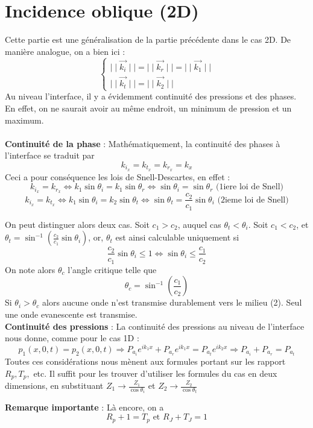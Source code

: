 \section{Incidence oblique (2D)}
Cette partie est une généralisation de la partie précédente dans le cas 2D. De manière analogue, on a bien ici :
\[
\left\{
\begin{array}{l}
\mid\mid \vec{k_i} \mid\mid = \mid\mid \vec{k_r} \mid\mid = \mid\mid \vec{k_1} \mid\mid \\
\mid\mid \vec{k_t} \mid\mid = \mid\mid \vec{k_2} \mid\mid
\end{array}
\right.
\]
Au niveau l'interface, il y a évidemment continuité des pressions et des phases. En effet, on ne saurait avoir au même endroit, un minimum de pression et un maximum.\\\\
\textbf{Continuité de la phase} : Mathématiquement, la continuité des phases à l'interface se traduit par
\[k_{i_x}=k_{t_x}=k_{r_x}=k_x\]
Ceci a pour conséquence les lois de Snell-Descartes, en effet :
\[ k_{i_x}=k_{r_x}\Leftrightarrow k_1\sin\theta_i=k_1\sin\theta_r\Leftrightarrow \sin\theta_i=\sin\theta_r \textrm{ (1iere loi de Snell)} \]
\[k_{i_x}=k_{t_x} \Leftrightarrow k_1\sin\theta_i=k_2\sin\theta_t\Leftrightarrow\sin\theta_t=\frac{c_2}{c_1}\sin\theta_i \textrm{ (2ieme loi de Snell)} \]

On peut distinguer alors deux cas. Soit $c_1>c_2$, auquel cas $\theta_t<\theta_i$. Soit $c_1<c_2$, et $\theta_t=\sin^{-1}(\frac{c_2}{c_1}\sin\theta_i)$, or, $\theta_t$ est ainsi calculable uniquement si 
\[ \frac{c_2}{c_1}\sin\theta_i\le 1 \Leftrightarrow \sin\theta_i \le \frac{c_1}{c_2} \]
On note alors $\theta_c$ l'angle critique telle que
\[ \theta_c=\sin^{-1}(\frac{c_1}{c_2}) \]
Si $\theta_i>\theta_c$ alors aucune onde n'est transmise durablement vers le milieu (2). Seul une onde evanescente est transmise.\\

\noindent\textbf{Continuité des pressions} : La continuité des pressions au niveau de l'interface nous donne, comme pour le cas 1D :
\[ p_1(x,0,t)=p_2(x,0,t) \Rightarrow P_{a_i}e^{ik_1x}+P_{a_r}e^{ik_1x}=P_{a_t}e^{ik_2x} \Rightarrow P_{a_i}+P_{a_r}=P_{a_t} \]
Toutes ces considérations nous mènent aux formules portant sur les rapport $R_p, T_p,$ etc. Il suffit pour les trouver d'utiliser les formules du cas en deux dimensions, en substituant $Z_1\rightarrow\frac{Z_1}{\cos\theta_i}$ et $Z_2\rightarrow\frac{Z_2}{\cos\theta_t}$

\noindent\textbf{Remarque importante} : Là encore, on a 
\[ 
R_p+1=T_p \textrm{ et } R_J+T_J=1
 \]
